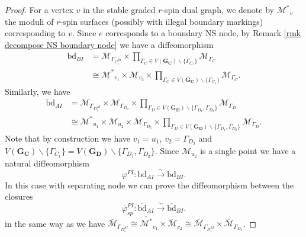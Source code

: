 \documentclass[11pt,a4paper]{article}
\theoremstyle{definition}
\theoremstyle{remark}
\numberwithin{equation}{section}
\def\M{{{\mathcal M}}}
\def\Mbar{{\overline{\mathcal M}}}
\def\Mstar{{{\mathcal M^*}}}
\def\Mbarstar{{\overline{\mathcal M^*}}}
\begin{document}
\begin{proof}
For a vertex $v$ in the stable graded $r$-spin dual graph, we denote by $\Mstar_v$ the moduli of $r$-spin surfaces (possibly with illegal boundary markings) corresponding to $v$. Since $e$ corresponds to a boundary NS node, by Remark \ref{rmk decompose NS boundary node}
we have a diffeomorphism
\begin{equation*}
\begin{split}
\text{bd}_{BI}&=\M_{\Gamma_{C_1^{BI}}}\times\prod_{\Gamma_C\in V(\mathbf{G_C})\backslash \{\Gamma_{C_1}\}}\M_{\Gamma_C}\\
&\cong \Mstar_{v_1}\times\M_{v_2}\times\prod_{\Gamma_C\in V(\mathbf{G_C})\backslash \{\Gamma_{C_1}\}}\M_{\Gamma_C}.
\end{split}
\end{equation*}
Similarly, we have 
\begin{equation*}
\begin{split}
\text{bd}_{AI}&=\M_{\Gamma_{D_1^{AI}}}\times\M_{\Gamma_{D_2}}\times\prod_{\Gamma_{D}\in V(\mathbf{G_D})\backslash \{\Gamma_{D_1},\Gamma_{D_2}\}}\M_{\Gamma_D}\\
&\cong \Mstar_{u_1}\times \M_{u_2}\times\M_{\Gamma_{D_2}}\times\prod_{\Gamma_D\in V(\mathbf{G_D})\backslash \{\Gamma_{D_1},\Gamma_{D_2}\}}\M_{\Gamma_D}.
\end{split}
\end{equation*}
Note that by construction we have $v_1=u_1$, $v_2=\Gamma_{D_2}$ and $V(\mathbf{G_C})\backslash \{\Gamma_{C_1}\}=V(\mathbf{G_D})\backslash \{\Gamma_{D_1},\Gamma_{D_2}\}$. Since $\M_{u_2}$ is a single point we have a natural diffeomorphism
\begin{equation}\label{eq iso bdry}
\varphi^{PI}\colon\text{bd}_{AI} \xrightarrow{\sim} \text{bd}_{BI}.
\end{equation}
In this case with separating node we can prove the diffeomorphism between the closures
\begin{equation}\label{eq iso bdry closure}
\bar{\varphi}^{PI}_{sp}\colon\overline{\text{bd}}_{AI} \xrightarrow{\sim} \overline{\text{bd}}_{BI}.
\end{equation}
in the same way as we have $\Mbar_{\Gamma_{D_1^{AI}}}\cong \Mbarstar_{v_1}\times\Mbar_{v_2}\cong \Mbar_{\Gamma_{D_1^{AI}}}\times\Mbar_{\Gamma_{D_2}}$.


\end{proof}
\end{document}
